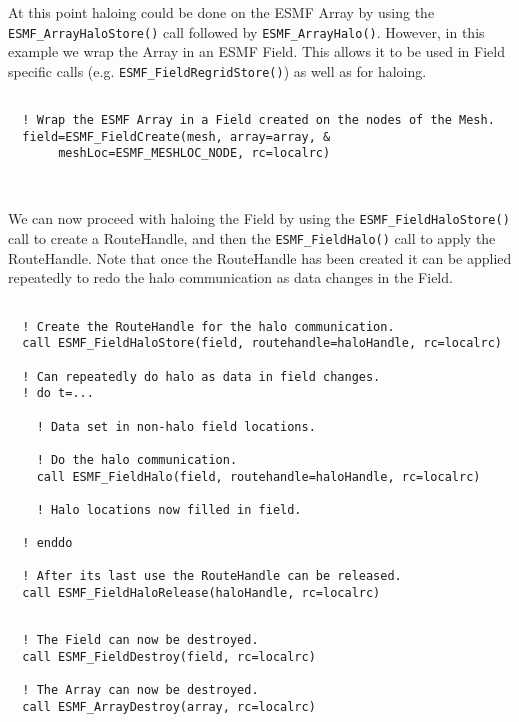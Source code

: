      At this point haloing could be done on the ESMF Array by using the {\tt ESMF\_ArrayHaloStore()} call
   followed by {\tt ESMF\_ArrayHalo()}. However, in this example we wrap the Array in an ESMF Field. 
   This allows it to be used in Field specific calls (e.g. {\tt ESMF\_FieldRegridStore()}) as well
   as for haloing. 
  

 \begin{verbatim}

  ! Wrap the ESMF Array in a Field created on the nodes of the Mesh. 
  field=ESMF_FieldCreate(mesh, array=array, &
       meshLoc=ESMF_MESHLOC_NODE, rc=localrc)

 
\end{verbatim}
 

  
   We can now proceed with haloing the Field by using the {\tt ESMF\_FieldHaloStore()} call to 
   create a RouteHandle, and then the {\tt ESMF\_FieldHalo()} call to apply the RouteHandle. Note 
   that once the RouteHandle has been created it can be applied repeatedly to redo the halo 
   communication as data changes in the Field. 
   

 \begin{verbatim}

  ! Create the RouteHandle for the halo communication.
  call ESMF_FieldHaloStore(field, routehandle=haloHandle, rc=localrc)

  ! Can repeatedly do halo as data in field changes.
  ! do t=...
 
    ! Data set in non-halo field locations. 

    ! Do the halo communication.
    call ESMF_FieldHalo(field, routehandle=haloHandle, rc=localrc)

    ! Halo locations now filled in field.

  ! enddo 

  ! After its last use the RouteHandle can be released.
  call ESMF_FieldHaloRelease(haloHandle, rc=localrc)
 
\end{verbatim}
 

 \begin{verbatim}
  ! The Field can now be destroyed.
  call ESMF_FieldDestroy(field, rc=localrc)

  ! The Array can now be destroyed.
  call ESMF_ArrayDestroy(array, rc=localrc)
 
\end{verbatim}

\setlength{\parskip}{\oldparskip}
\setlength{\parindent}{\oldparindent}
\setlength{\baselineskip}{\oldbaselineskip}
